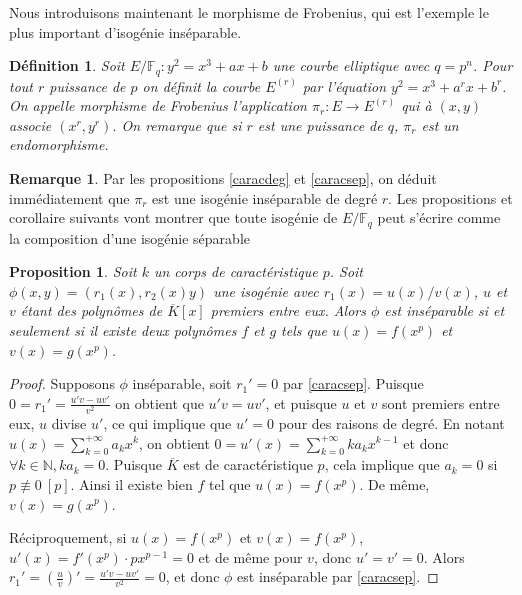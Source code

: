 \documentclass{article}
\theoremstyle{plain}%
\newtheorem{prop}[thm]{Proposition}
\newtheorem{deff}[thm]{Définition}
\theoremstyle{definition}%
\newtheorem{rem}[thm]{Remarque}
\newcommand{\F}{\mathbb{F}}
\newcommand{\N}{\mathbb{N}}
\begin{document}
Nous introduisons maintenant le morphisme de Frobenius, qui est l'exemple le plus important d'isogénie inséparable.

\begin{deff}
  Soit $E/\F_q : y^2 = x^3 + ax + b$ une courbe elliptique avec $q = p^n$. Pour tout $r$ puissance de $p$ on définit la courbe $E^{(r)}$ par l'équation $y^2 = x^3 + a^r x + b^r$. On appelle morphisme de Frobenius l'application $\pi_r : E \to E^{(r)}$ qui à $(x, y)$ associe $(x^r, y^r)$. On remarque que si $r$ est une puissance de $q$, $\pi_r$ est un endomorphisme.
\end{deff}


\begin{rem}
  \label{degpi}
  Par les propositions \ref{caracdeg} et \ref{caracsep}, on déduit immédiatement que $\pi_r$ est une isogénie inséparable de degré $r$. Les propositions et corollaire suivants vont montrer que toute isogénie de $E/\F_q$ peut s'écrire comme la composition d'une isogénie séparable 
\end{rem}



\begin{prop}
  Soit $k$ un corps de caractéristique $p$. Soit $\phi(x, y) = (r_1(x), r_2(x)y)$ une isogénie avec $r_1(x) = u(x)/v(x)$, $u$ et $v$ étant des polynômes de $\overline{K}[x]$ premiers entre eux. Alors $\phi$ est inséparable si et seulement si il existe deux polynômes $f$ et $g$ tels que $u(x) = f(x^p)$ et $v(x) = g(x^p)$.
\end{prop}


\begin{proof}
  Supposons $\phi$ inséparable, soit $r_1' = 0$ par \ref{caracsep}. Puisque $0 = r_1' = \frac{u'v -uv'}{v^2}$ on obtient que $u'v = uv'$, et puisque $u$ et $v$ sont premiers entre eux, $u$ divise $u'$, ce qui implique que $u' = 0$ pour des raisons de degré.  En notant $u(x) = \sum_{k=0}^{+\infty} a_kx^k$, on obtient $0 = u'(x) = \sum_{k=0}^{+\infty} ka_kx^{k-1}$ et donc $\forall k\in \N, ka_k = 0$. Puisque $\overline{K}$ est de caractéristique $p$, cela implique que $a_k = 0$ si $p\not\equiv 0\ [p]$. Ainsi il existe bien $f$ tel que $u(x) = f(x^p)$. De même, $v(x) = g(x^p)$. 

  Réciproquement, si $u(x) = f(x^p)$ et $v(x) = f(x^p)$, $u'(x) = f'(x^p)\cdot px^{p-1} = 0$ et de même pour $v$, donc $u' = v' = 0$. Alors $r_1' = (\frac{u}{v})' =  \frac{u'v -uv'}{v^2} = 0$, et donc $\phi$ est inséparable par \ref{caracsep}.
\end{proof}
\end{document}
